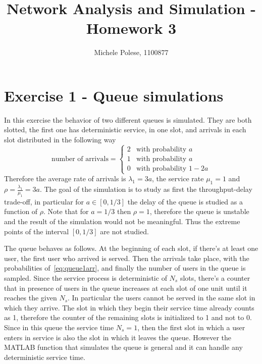 \documentclass[10pt]{article}
\begin{document}
\title{Network Analysis and Simulation - Homework 3}
\author{Michele Polese, 1100877}

\maketitle

\section*{Exercise 1 - Queue simulations}
In this exercise the behavior of two different queues is simulated. They are both slotted, the first one has deterministic service, in one slot, and arrivals in each slot distributed in the following way
\begin{equation}
  \mbox{number of arrivals} = 
  \begin{cases}
    2 & \mbox{with probability } a\\
    1 & \mbox{with probability } a\\
    0 & \mbox{with probability } 1-2a
  \end{cases}
  \label{eq:queue1arr}
\end{equation}
Therefore the average rate of arrivals is $\lambda_1 = 3a$, the service rate $\mu_1 = 1$ and $\rho = \frac{\lambda_1}{\mu_1} = 3a$. 
The goal of the simulation is to study as first the throughput-delay trade-off, in particular for $a \in [0, 1/3]$ the delay of the queue is studied as a function of $\rho$. Note that for $a = 1/3$ then $\rho = 1$, therefore the queue is unstable and the result of the simulation would not be meaningful. Thus the extreme points of the interval $[0, 1/3]$ are not studied. 

The queue behaves as follows. At the beginning of each slot, if there's at least one user, the first user who arrived is served. Then the arrivals take place, with the probabilities of~\eqref{eq:queue1arr}, and finally the number of users in the queue is sampled. Since the service process is deterministic of $N_s$ slots, there's a counter that in presence of users in the queue increases at each slot of one unit until it reaches the given $N_s$. In particular the users cannot be served in the same slot in which they arrive. The slot in which they begin their service time already counts as 1, therefore the counter of the remaining slots is initialized to 1 and not to 0. Since in this queue the service time $N_s = 1$, then the first slot in which a user enters in service is also the slot in which it leaves the queue. However the MATLAB function that simulates the queue is general and it can handle any deterministic service time. 
\end{document}

